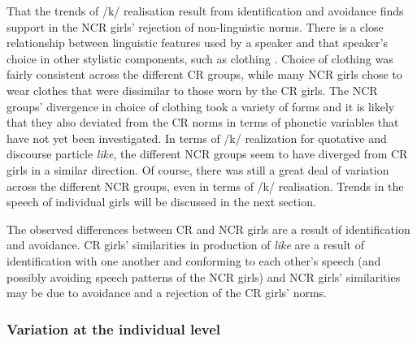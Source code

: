 That the trends of /k/ realisation result from identification and avoidance finds support in the NCR girls' rejection of non-linguistic norms. There is a close relationship between linguistic features used by a speaker and that speaker's choice in other stylistic components, such as clothing \citep[89]{bourdieu1991}. Choice of clothing was fairly consistent across the different CR groups, while many NCR girls chose to wear clothes that were dissimilar to those worn by the CR girls. The NCR groups' divergence in choice of clothing took a variety of forms and it is likely that they also deviated from the CR norms in terms of phonetic variables that have not yet been investigated. In terms of /k/ realization for quotative and discourse particle \textit{like}, the different NCR groups seem to have diverged from CR girls in a similar direction. Of course, there was still a great deal of variation across the different NCR groups, even in terms of /k/ realisation. Trends in the speech of individual girls will be discussed in the next section.

The observed differences between CR and NCR girls are a result of identification and avoidance. CR girls' similarities in production of \textit{like} are a result of identification with one another and conforming to each other's speech (and possibly avoiding speech patterns of the NCR girls) and NCR girls' similarities may be due to avoidance and a rejection of the CR girls' norms.




\subsubsection{Variation at the individual level}\label{theindividual}

